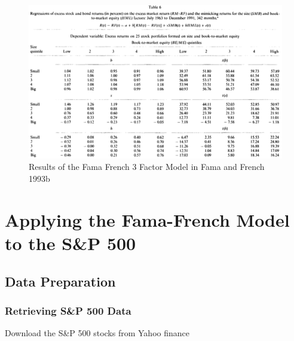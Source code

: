 \documentclass{beamer}
\begin{document}
\begin{frame}
\begin{figure}
\centering
\includegraphics[scale=.35]{FF1993-Table6.png}
\caption{Results of the Fama French 3 Factor Model in Fama and French 1993b}
\end{figure}
\end{frame}

\section{Applying the Fama-French Model to the S\&P 500}

\begin{frame}

\end{frame}

\subsection{Data Preparation}

\begin{frame}[fragile]
\frametitle{Retrieving S\&P 500 Data}
Download the S\&P 500 stocks from Yahoo finance

\end{frame}
\end{document}
